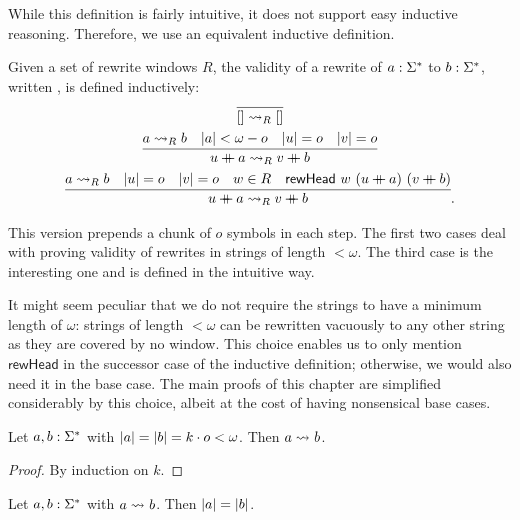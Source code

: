 While this definition is fairly intuitive, it does not support easy inductive reasoning. Therefore, we use an equivalent inductive definition.

\begin{definition}[Validity] 
  Given a set of rewrite windows $R$, the validity of a rewrite of $a : \Sigma^*$ to $b : \Sigma^*$, written , is defined inductively:  
  \begin{gather*}
    \infer{\nil \strent{R} \nil}{} \\
    \infer{u\concat{} a \strent{R} v \concat{} b}{a \strent{R} b \quad \length{a} < \omega - o \quad \length{u} = o \quad \length{v} = o} \\
    \infer{u \concat{} a \strent{R} v \concat{} b}{a \strent{R} b \quad \length{u} = o \quad \length{v} = o \quad w \in R \quad \rewHead{w}{(u\concat{}a)}{(v \concat{} b)}}.
  \end{gather*}
\end{definition}

This version prepends a chunk of $o$ symbols in each step. The first two cases deal with proving validity of rewrites in strings of length $< \omega$. The third case is the interesting one and is defined in the intuitive way.

\begin{remark}
  It might seem peculiar that we do not require the strings to have a minimum length of $\omega$: strings of length $< \omega$ can be rewritten vacuously to any other string as they are covered by no window. 
  This choice enables us to only mention $\textsf{rewHead}$ in the successor case of the inductive definition; otherwise, we would also need it in the base case. The main proofs of this chapter are simplified considerably by this choice, albeit at the cost of having nonsensical base cases.
\end{remark}

\begin{proposition}\label{lem:vacuous}
  Let $a, b : \Sigma^*$ with $|a| = |b| = k \cdot o < \omega$. Then $a \rightsquigarrow_{} b$. 
\end{proposition}
\begin{proof}
  By induction on $k$.
\end{proof}

\begin{proposition}
  Let $a, b : \Sigma^*$ with $a \rightsquigarrow_{} b$. Then $|a| = |b|$. 
\end{proposition}

